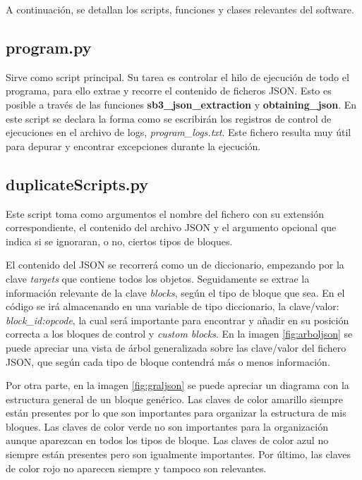 \documentclass[a4paper, 12pt]{book}
\begin{document}
A continuación, se detallan los scripts, funciones y clases relevantes del software.

\subsection{program.py}

Sirve como script principal. Su tarea es controlar el hilo de ejecución de todo el programa, para ello extrae y recorre el contenido de ficheros JSON. Esto es posible a través de las funciones \textbf{sb3\_json\_extraction} y \textbf{obtaining\_json}. En este script se declara la forma como se escribirán los registros de control de ejecuciones en el archivo de logs, \textit{program\_logs.txt}. Este fichero resulta muy útil para depurar y encontrar excepciones durante la ejecución.

\subsection{duplicateScripts.py}

Este script toma como argumentos el nombre del fichero con su extensión correspondiente, el contenido del archivo JSON y el argumento opcional que indica si se ignoraran, o no, ciertos tipos de bloques.

El contenido del JSON se recorrerá como un de diccionario, empezando por la clave \textit{targets} que contiene todos los objetos. Seguidamente se extrae la información relevante de la clave \textit{blocks}, según el tipo de bloque que sea. En el código se irá almacenando en una variable de tipo diccionario, la clave/valor: \textit{block\_id:opcode}, la cual será importante para encontrar y añadir en su posición correcta a los bloques de control y \textit{custom blocks}. En la imagen \ref{fig:arboljson} se puede apreciar una vista de árbol generalizada sobre las clave/valor del fichero JSON, que según cada tipo de bloque contendrá más o menos información. 

Por otra parte, en la imagen \ref{fig:graljson} se puede apreciar un diagrama con la estructura general de un bloque genérico. Las claves de color amarillo siempre están presentes por lo que son importantes para organizar la estructura de mis bloques. Las claves de color verde no son importantes para la organización aunque aparezcan en todos los tipos de bloque. Las claves de color azul no siempre están presentes pero son igualmente importantes. Por último, las claves de color rojo no aparecen siempre y tampoco son relevantes.
\end{document}
